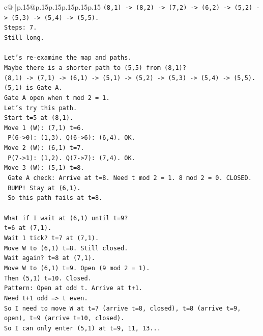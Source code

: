 \documentclass{article}
\begin{document}
{\begin{supertabular}{c@{$\;$}|p{.15\linewidth}@{}p{.15\linewidth}p{.15\linewidth}p{.15\linewidth}p{.15\linewidth}p{.15\linewidth}}
{{{\texttt{(8,1) {-}> (8,2) {-}> (7,2) {-}> (6,2) {-}> (5,2) {-}> (5,3) {-}> (5,4) {-}> (5,5).} \\
\texttt{Steps: 7.} \\
\texttt{Still long.} \\
\\ 
\texttt{Let's re{-}examine the map and paths.} \\
\texttt{Maybe there is a shorter path to (5,5) from (8,1)?} \\
\texttt{(8,1) {-}> (7,1) {-}> (6,1) {-}> (5,1) {-}> (5,2) {-}> (5,3) {-}> (5,4) {-}> (5,5).} \\
\texttt{(5,1) is Gate A.} \\
\texttt{Gate A open when t mod 2 = 1.} \\
\texttt{Let's try this path.} \\
\texttt{Start t=5 at (8,1).} \\
\texttt{Move 1 (W): (7,1) t=6.} \\
\texttt{  P(6{-}>0): (1,3). Q(6{-}>6): (6,4). OK.} \\
\texttt{Move 2 (W): (6,1) t=7.} \\
\texttt{  P(7{-}>1): (1,2). Q(7{-}>7): (7,4). OK.} \\
\texttt{Move 3 (W): (5,1) t=8.} \\
\texttt{  Gate A check: Arrive at t=8. Need t mod 2 = 1. 8 mod 2 = 0. CLOSED.} \\
\texttt{  BUMP! Stay at (6,1).} \\
\texttt{  So this path fails at t=8.} \\
\\ 
\texttt{What if I wait at (6,1) until t=9?} \\
\texttt{t=6 at (7,1).} \\
\texttt{Wait 1 tick? t=7 at (7,1).} \\
\texttt{Move W to (6,1) t=8. Still closed.} \\
\texttt{Wait again? t=8 at (7,1).} \\
\texttt{Move W to (6,1) t=9. Open (9 mod 2 = 1).} \\
\texttt{Then (5,1) t=10. Closed.} \\
\texttt{Pattern: Open at odd t. Arrive at t+1.} \\
\texttt{Need t+1 odd => t even.} \\
\texttt{So I need to move W at t=7 (arrive t=8, closed), t=8 (arrive t=9, open), t=9 (arrive t=10, closed).} \\
\texttt{So I can only enter (5,1) at t=9, 11, 13...} \\
}}}
\end{supertabular}}
\end{document}
